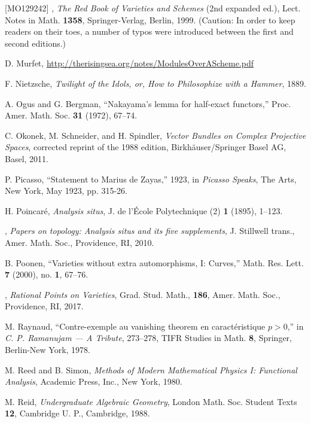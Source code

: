 \begin{thebibliography}{[MO129242]}
\sameauthor, \emph{The Red Book of Varieties and Schemes} (2nd expanded ed.),
Lect. Notes in Math. \textbf{1358}, Springer-Verlag, Berlin, 1999. (Caution:
In order to keep readers on their toes, a number of typos were introduced
between the first and second editions.)

D. Murfet, \url{http://therisingsea.org/notes/ModulesOverAScheme.pdf}

F. Nietzsche, \emph{Twilight of the Idols, or, How to Philosophize with a
Hammer}, 1889.

A. Ogus and G. Bergman, ``Nakayama's lemma for half-exact functors,'' Proc.
Amer. Math. Soc. \textbf{31} (1972), 67--74.

C. Okonek, M. Schneider, and H. Spindler, \emph{Vector Bundles on Complex
Projective Spaces}, corrected reprint of the 1988 edition,
Birkhäuser/Springer Basel AG, Basel, 2011.

P. Picasso, ``Statement to Marius de Zayas,'' 1923, in \emph{Picasso Speaks},
The Arts, New York, May 1923, pp. 315-26.

H. Poincaré, \emph{Analysis situs}, J. de l'École Polytechnique (2)
\textbf{1} (1895), 1--123.

\sameauthor, \emph{Papers on topology: Analysis situs and its five
supplements}, J. Stillwell trans., Amer. Math. Soc., Providence, RI, 2010.

B. Poonen, ``Varieties without extra automorphisms, I: Curves,'' Math. Res.
Lett. \textbf{7} (2000), no. \textbf{1}, 67--76.

\sameauthor, \emph{Rational Points on Varieties}, Grad. Stud. Math.,
\textbf{186}, Amer. Math. Soc., Providence, RI, 2017.

M. Raynaud, ``Contre-exemple au vanishing theorem en caractéristique $p>0$,''
in \emph{C. P. Ramanujam --- A Tribute}, 273--278, TIFR Studies in Math.
\textbf{8}, Springer, Berlin-New York, 1978.

M. Reed and B. Simon, \emph{Methods of Modern Mathematical Physics I:
Functional Analysis}, Academic Press, Inc., New York, 1980.

M. Reid, \emph{Undergraduate Algebraic Geometry}, London Math. Soc. Student
Texts \textbf{12}, Cambridge U. P., Cambridge, 1988.


\end{thebibliography}
